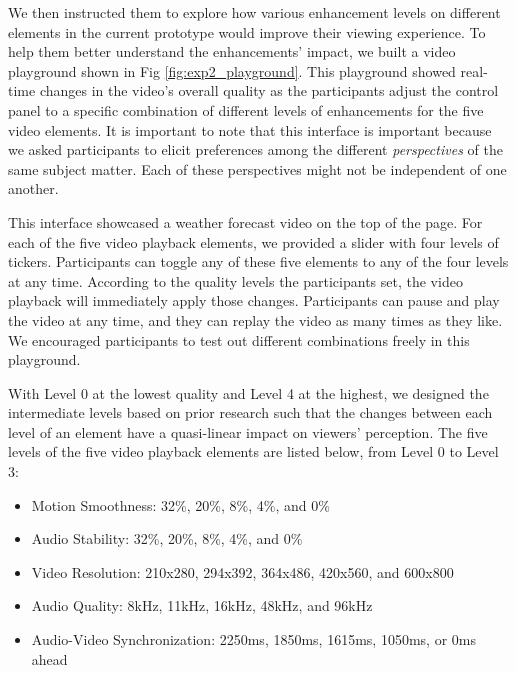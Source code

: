 We then instructed them to explore how various enhancement levels on different elements in the current prototype would improve their viewing experience. To help them better understand the enhancements' impact, we built a video playground shown in Fig \ref{fig:exp2_playground}. This playground showed real-time changes in the video's overall quality as the participants adjust the control panel to a specific combination of different levels of enhancements for the five video elements. It is important to note that this interface is important because we asked participants to elicit preferences among the different \textit{perspectives} of the same subject matter. Each of these perspectives might not be independent of one another.

This interface showcased a weather forecast video on the top of the page. For each of the five video playback elements, we provided a slider with four levels of tickers. Participants can toggle any of these five elements to any of the four levels at any time. According to the quality levels the participants set, the video playback will immediately apply those changes. Participants can pause and play the video at any time, and they can replay the video as many times as they like. We encouraged participants to test out different combinations freely in this playground.

With Level 0 at the lowest quality and Level 4 at the highest, we designed the intermediate levels based on prior research \cite{claypool1999effects,oeldorf2012bad, noll1993wideband,knoche2008low, steinmetz1996human} such that the changes between each level of an element have a quasi-linear impact on viewers' perception. The five levels of the five video playback elements are listed below, from Level 0 to Level 3:
\begin{itemize}
    \item Motion Smoothness: 32\%, 20\%, 8\%, 4\%, and 0\%
    \item Audio Stability: 32\%, 20\%, 8\%, 4\%, and 0\%
    \item Video Resolution: 210x280, 294x392, 364x486, 420x560, and 600x800 
    \item Audio Quality: 8kHz, 11kHz, 16kHz, 48kHz, and 96kHz
    \item Audio-Video Synchronization: 2250ms, 1850ms,  1615ms, 1050ms, or 0ms ahead
\end{itemize}

